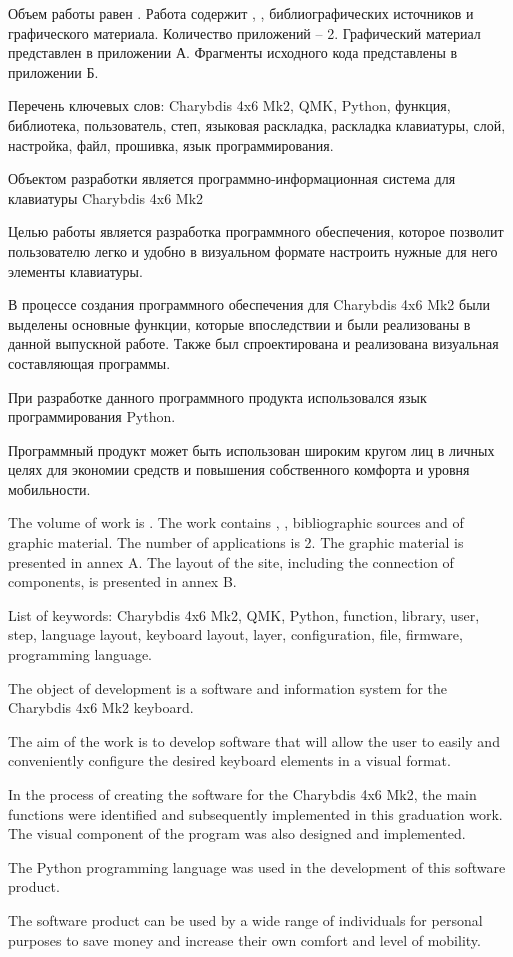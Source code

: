 
Объем работы равен . Работа содержит , ,  библиографических источников и  графического материала. Количество приложений – 2. Графический материал представлен в приложении А. Фрагменты исходного кода представлены в приложении Б.

Перечень ключевых слов: Charybdis 4x6 Mk2, QMK, Python, функция, библиотека, пользователь, степ, языковая раскладка, раскладка клавиатуры, слой, настройка, файл, прошивка, язык программирования.

Объектом разработки является программно-информационная система для клавиатуры Charybdis 4x6 Mk2

Целью работы является разработка программного обеспечения, которое позволит пользователю легко и удобно в визуальном формате настроить нужные для него элементы клавиатуры.

В процессе создания программного обеспечения для Charybdis 4x6 Mk2 были выделены основные функции, которые впоследствии и были реализованы в данной выпускной работе. Также был спроектирована и реализована визуальная составляющая программы.

При разработке данного программного продукта использовался язык программирования Python.

Программный продукт может быть использован широким кругом лиц в личных целях для экономии средств и повышения собственного комфорта и уровня мобильности.

  
The volume of work is . The work contains , ,  bibliographic sources and  of graphic material. The number of applications is 2. The graphic material is presented in annex A. The layout of the site, including the connection of components, is presented in annex B.

List of keywords: Charybdis 4x6 Mk2, QMK, Python, function, library, user, step, language layout, keyboard layout, layer, configuration, file, firmware, programming language.

The object of development is a software and information system for the Charybdis 4x6 Mk2 keyboard.

The aim of the work is to develop software that will allow the user to easily and conveniently configure the desired keyboard elements in a visual format.

In the process of creating the software for the Charybdis 4x6 Mk2, the main functions were identified and subsequently implemented in this graduation work. The visual component of the program was also designed and implemented.

The Python programming language was used in the development of this software product.

The software product can be used by a wide range of individuals for personal purposes to save money and increase their own comfort and level of mobility.
